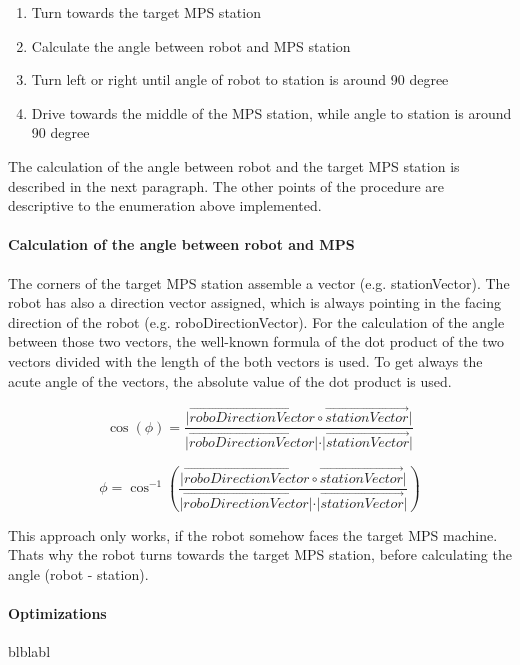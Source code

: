\begin{enumerate}
\item Turn towards the target MPS station
\item Calculate the angle between robot and MPS station
\item Turn left or right until angle of robot to station is around 90 degree
\item Drive towards the middle of the MPS station, while angle to station is around 90 degree
\end{enumerate}

The calculation of the angle between robot and the target MPS station is described in the next paragraph. The other points of the procedure are descriptive to the enumeration above implemented.

\paragraph{Calculation of the angle between robot and MPS}

The corners of the target MPS station assemble a vector (e.g. stationVector). The robot has also a direction vector assigned, which is always pointing in the facing direction of the robot (e.g. roboDirectionVector). For the calculation of the angle between those two vectors, the well-known formula of the dot product of the two vectors divided with the length of the both vectors is used. To get always the acute angle of the vectors, the absolute value of the dot product is used. 

\begin{equation}
\cos(\phi) = \frac{ \vert \overrightarrow{roboDirectionVector} \circ \overrightarrow{stationVector} \vert} { \vert \overrightarrow{roboDirectionVector}  \vert  \cdot \vert \overrightarrow{stationVector}  \vert}
\end{equation}

\begin{equation}
\phi = \cos ^{ - 1} \left( \frac{ \vert \overrightarrow{roboDirectionVector} \circ \overrightarrow{stationVector} \vert} { \vert \overrightarrow{roboDirectionVector}  \vert  \cdot \vert \overrightarrow{stationVector}  \vert} \right)
\end{equation}

This approach only works, if the robot somehow faces the target MPS machine. Thats why the robot turns towards the target MPS station, before calculating the angle (robot - station). 

\paragraph{Optimizations}
blblabl



